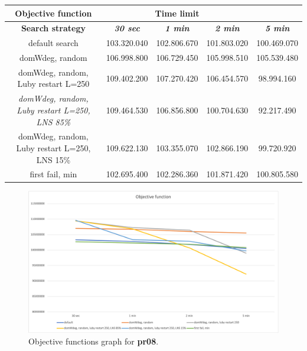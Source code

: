 {
\renewcommand{\arraystretch}{2}
\begin{longtable}[h]{| c | c | c | c | c |}
    \hline
    \textbf{Objective function} & \multicolumn{3}{c}{\textbf{Time limit}} & \\
    \hline
    \textbf{Search strategy} & \textbf{\textit{30 sec}} & \textbf{\textit{1 min}} & \textbf{\textit{2 min}} & \textbf{\textit{5 min}} \\
    \hline
    \endhead
    default search                                         & 103.320.040 & 102.806.670 & 101.803.020 & 100.469.070 \\
    \hline
    domWdeg, random                                        & 106.998.800 & 106.729.450 & 105.998.510 & 105.539.480 \\
    \hline
    domWdeg, random, Luby restart L=250                    & 109.402.200 & 107.270.420 & 106.454.570 &  98.994.160 \\
    \hline
    \textit{domWdeg, random, Luby restart L=250, LNS 85\%} & 109.464.530 & 106.856.800 & 100.704.630 &  92.217.490 \\
    \hline
    domWdeg, random, Luby restart L=250, LNS 15\%          & 109.622.130 & 103.355.070 & 102.866.190 &  99.720.920 \\
    \hline
    first fail, min                                        & 102.695.400 & 102.286.360 & 101.871.420 & 100.805.580 \\
    \hline
\end{longtable}
}
\begin{figure}[H]
    \centering
    \includegraphics[width=0.8\columnwidth]{../graphs/pr08-objf.png}
    \caption{Objective functions graph for \textbf{pr08}.}
\end{figure}

